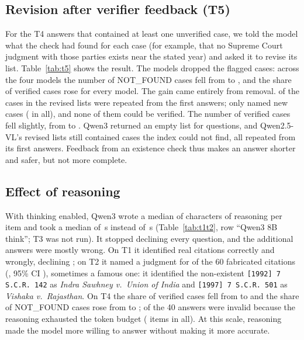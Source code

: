 \subsection{Revision after verifier feedback (T5)}
For the \TFiveQAll{} T4 answers that contained at least one unverified case, we told the model what the check had found for each case (for example, that no Supreme Court judgment with those parties exists near the stated year) and asked it to revise its list. Table~\ref{tab:t5} shows the result. The models dropped the flagged cases: across the four models the number of NOT\_FOUND cases fell from \TFiveNFBeforeAll{} to \TFiveNFAfterAll{}, and the share of verified cases rose for every model. The gain came entirely from removal. \TFiveRepeatedAll{} of the \TFiveCasesAfterAll{} cases in the revised lists were repeated from the first answers; only \TFiveNewCaseModels{} named new cases (\TFiveNewCasesAll{} in all), and none of them could be verified. The number of verified cases fell slightly, from \TFiveVerBeforeAll{} to \TFiveVerAfterAll{}. Qwen3 returned an empty list for \TFiveEmptyAfterQwen{} questions, and Qwen2.5-VL's revised lists still contained \TFiveKeptNFQwenVL{} cases the index could not find, all repeated from its first answers. Feedback from an existence check thus makes an answer shorter and safer, but not more complete.

\begin{table}[t]
\caption{T5: the T4 answers that contained an unverified case (Q), before and after the model revised them with the verifier's feedback.}
\label{tab:t5}
\centering
\footnotesize
\setlength{\tabcolsep}{3.5pt}

\end{table}

\subsection{Effect of reasoning}
With thinking enabled, Qwen3 wrote a median of \ThinkMedianChars{} characters of reasoning per item and took a median of \ThinkMedianSec{}\,s instead of \NoThinkMedianSec{}\,s (Table~\ref{tab:t1t2}, row ``Qwen3 8B think''; T3 was not run). It stopped declining every question, and the additional answers were mostly wrong. On T1 it identified \ThinkTOneCorrect{} real citations correctly and \ThinkTOneWrong{} wrongly, declining \ThinkTOneDecl{}; on T2 it named a judgment for \ThinkTTwoNamed{} of the 60 fabricated citations (\TTwoNamedPctQwenThink, 95\% CI \TTwoNamedCIQwenThink), sometimes a famous one: it identified the non-existent \texttt{[1992] 7 S.C.R.~142} as \emph{Indra Sawhney v.\ Union of India} and \texttt{[1997] 7 S.C.R.~501} as \emph{Vishaka v.\ Rajasthan}. On T4 the share of verified cases fell from \NoThinkTFourVerPct{} to \ThinkTFourVerPct{} and the share of NOT\_FOUND cases rose from \NoThinkTFourNFPct{} to \ThinkTFourNFPct{}; \ThinkTFourInvalid{} of the 40 answers were invalid because the reasoning exhausted the token budget (\ThinkTruncated{} items in all). At this scale, reasoning made the model more willing to answer without making it more accurate.
